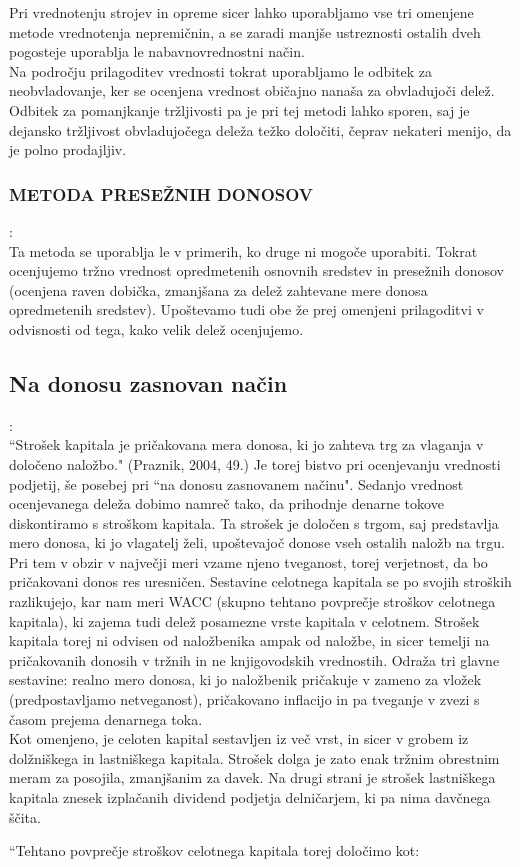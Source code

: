 \documentclass[12pt,a4paper]{amsart}
\theoremstyle{definition} %
\theoremstyle{plain} %
\begin{document}
Pri vrednotenju strojev in opreme sicer lahko uporabljamo vse tri omenjene metode vrednotenja nepremičnin, a se zaradi manjše ustreznosti ostalih dveh pogosteje uporablja le nabavnovrednostni način.\\
Na področju prilagoditev vrednosti tokrat uporabljamo le odbitek za neobvladovanje, ker se ocenjena vrednost običajno nanaša za obvladujoči delež. Odbitek za pomanjkanje tržljivosti pa je pri tej metodi lahko sporen, saj je dejansko tržljivost obvladujočega deleža težko določiti, čeprav nekateri menijo, da je polno prodajljiv.

\subsubsection{METODA PRESEŽNIH DONOSOV}:\\
Ta metoda se uporablja le v primerih, ko druge ni mogoče uporabiti. Tokrat ocenjujemo tržno vrednost opredmetenih osnovnih sredstev in presežnih donosov (ocenjena raven dobička, zmanjšana za delež zahtevane mere donosa opredmetenih sredstev). Upoštevamo tudi obe že prej omenjeni prilagoditvi v odvisnosti od tega, kako velik delež ocenjujemo. 


\subsection{Na donosu zasnovan način}:\\

``Strošek kapitala je pričakovana mera donosa, ki jo zahteva trg za vlaganja v določeno naložbo." (Praznik, 2004, 49.) Je torej bistvo pri ocenjevanju vrednosti podjetij,  še posebej pri ``na donosu zasnovanem načinu". Sedanjo vrednost ocenjevanega deleža dobimo namreč tako, da prihodnje denarne tokove diskontiramo s stroškom kapitala. Ta strošek je določen s trgom, saj predstavlja mero donosa, ki jo vlagatelj želi, upoštevajoč donose vseh ostalih naložb na trgu. Pri tem v obzir v največji meri vzame njeno tveganost, torej verjetnost, da bo pričakovani donos res uresničen. Sestavine celotnega kapitala se po svojih stroških razlikujejo, kar nam meri WACC (skupno tehtano povprečje stroškov celotnega kapitala), ki zajema tudi delež posamezne vrste kapitala v celotnem. Strošek kapitala torej ni odvisen od naložbenika ampak od naložbe, in sicer temelji na pričakovanih donosih v tržnih in ne knjigovodskih vrednostih. Odraža tri glavne sestavine: realno mero donosa, ki jo naložbenik pričakuje v zameno za vložek (predpostavljamo netveganost), pričakovano inflacijo in pa tveganje v zvezi s časom prejema denarnega toka.\\
Kot omenjeno, je celoten kapital sestavljen iz več vrst, in sicer v grobem iz dolžniškega in lastniškega kapitala. Strošek dolga je zato enak tržnim obrestnim meram za posojila, zmanjšanim za davek. Na drugi strani je strošek lastniškega kapitala znesek izplačanih dividend podjetja delničarjem, ki pa nima davčnega ščita.\par
``Tehtano povprečje stroškov celotnega kapitala torej določimo kot:
\end{document}
